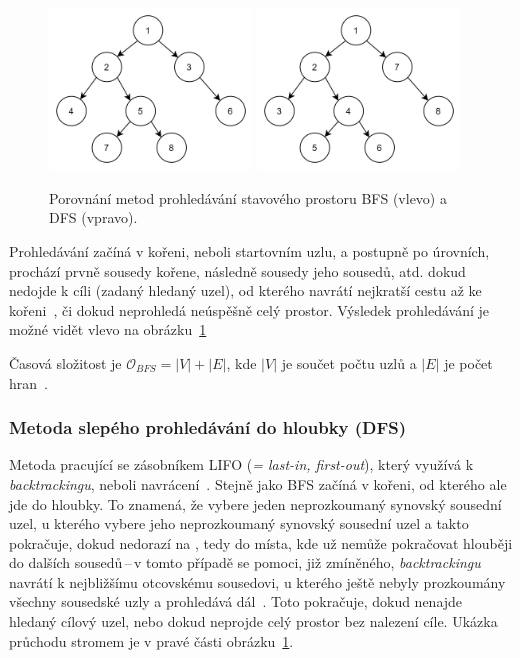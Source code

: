 \begin{figure}[H]
    \centering
    \includegraphics[width=0.48\textwidth]{obrazky-figures/ch2/BFS.png}\hspace{0.25cm}
    \includegraphics[width=0.48\textwidth]{obrazky-figures/ch2/DFS.png}
    \caption{Porovnání metod prohledávání stavového prostoru BFS (vlevo) a DFS (vpravo).}
    \label{fig:BFS_DFS}
\end{figure}

Prohledávání začíná v kořeni, neboli startovním uzlu, a postupně po úrovních, prochází prvně sousedy kořene, následně sousedy jeho sousedů, atd. dokud nedojde k cíli (zadaný hledaný uzel), od kterého navrátí nejkratší cestu až ke kořeni~\cite{Introduction_to_Algorithms}, či dokud neprohledá neúspěšně celý prostor. Výsledek prohledávání je možné vidět vlevo na obrázku~\ref{fig:BFS_DFS}

Časová složitost je \(\mathcal{O}_{BFS} = |V| + |E|\), kde \(|V|\) je součet počtu uzlů a \(|E|\) je počet hran~\cite{CS225BFSDFS}.

\subsubsection*{\textbullet Metoda slepého prohledávání do hloubky (DFS)}
Metoda pracující se zásobníkem LIFO (\textit{= last-in, first-out}), který využívá k \textit{backtrackingu}, neboli navrácení~\cite{poole2023artificial}. Stejně jako BFS začíná v kořeni, od kterého ale jde do hloubky. To znamená, že vybere jeden neprozkoumaný synovský sousední uzel, u kterého vybere jeho neprozkoumaný synovský sousední uzel a takto pokračuje, dokud nedorazí na , tedy do místa, kde už nemůže pokračovat hlouběji do dalších sousedů\,--\,v tomto případě se pomoci, již zmíněného, \textit{backtrackingu} navrátí k nejbližšímu otcovskému sousedovi, u kterého ještě nebyly prozkoumány všechny sousedské uzly a prohledává dál~\cite{Introduction_to_Algorithms}. Toto pokračuje, dokud nenajde hledaný cílový uzel, nebo dokud neprojde celý prostor bez nalezení cíle. Ukázka průchodu stromem je v pravé části obrázku~\ref{fig:BFS_DFS}.

